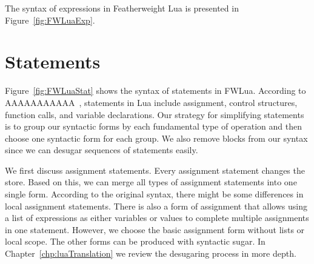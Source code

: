 The syntax of expressions in Featherweight Lua is presented in Figure~\ref{fig:FWLuaExp}.


\section{Statements}
Figure~\ref{fig:FWLuaStat} shows the syntax of statements in FWLua.
According to AAAAAAAAAAA~\cite{PIL},
statements in Lua include assignment, control structures, function calls, and variable declarations.
%
Our strategy for simplifying statements is to group our syntactic forms by each fundamental type of operation and then choose one syntactic form for each group.
We also remove blocks from our syntax since we can desugar sequences of statements easily.

We first discuss assignment statements.
Every assignment statement changes the store. Based on this, we can merge all types of assignment statements into one single form. According to the original syntax, there might be some differences in local assignment statements.  There is also a form of assignment that allows using a list of expressions as either variables or values to complete multiple assignments in one statement. However, we choose the basic assignment form without lists or local scope.  The other forms can be produced with syntactic sugar.
In Chapter~\ref{chp:luaTranslation} we review the desugaring process in more depth.

